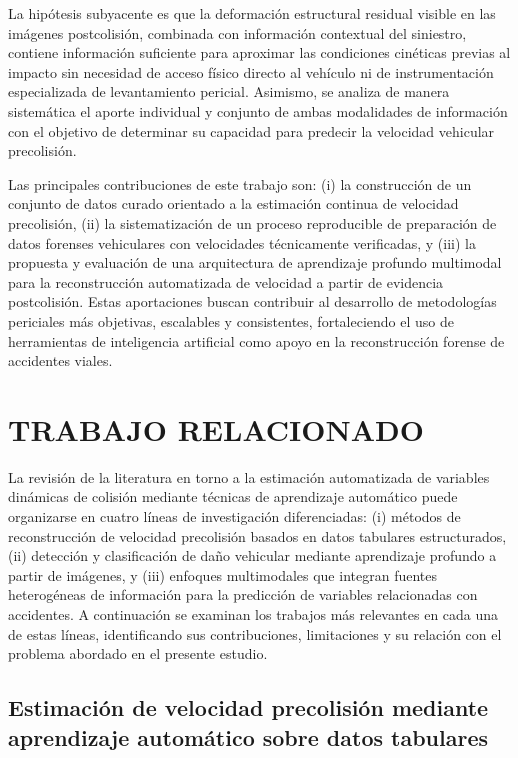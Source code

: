 \documentclass[esp]{SpeedEstimationAI_paper}
\begin{document}
La hipótesis subyacente es que la deformación estructural residual visible en las imágenes postcolisión, combinada con información contextual del siniestro, contiene información suficiente para aproximar las condiciones cinéticas previas al impacto sin necesidad de acceso físico directo al vehículo ni de instrumentación especializada de levantamiento pericial. Asimismo, se analiza de manera sistemática el aporte individual y conjunto de ambas modalidades de información con el objetivo de determinar su capacidad para predecir la velocidad vehicular precolisión.

Las principales contribuciones de este trabajo son: (i) la construcción de un conjunto de datos curado orientado a la estimación continua de velocidad precolisión, (ii) la sistematización de un proceso reproducible de preparación de datos forenses vehiculares con velocidades técnicamente verificadas, y (iii) la propuesta y evaluación de una arquitectura de aprendizaje profundo multimodal para la reconstrucción automatizada de velocidad a partir de evidencia postcolisión. Estas aportaciones buscan contribuir al desarrollo de metodologías periciales más objetivas, escalables y consistentes, fortaleciendo el uso de herramientas de inteligencia artificial como apoyo en la reconstrucción forense de accidentes viales.

\section{TRABAJO RELACIONADO}
La revisión de la literatura en torno a la estimación automatizada de variables dinámicas de colisión mediante técnicas de aprendizaje automático puede organizarse en cuatro líneas de investigación diferenciadas: (i) métodos de reconstrucción de velocidad precolisión basados en datos tabulares estructurados, (ii) detección y clasificación de daño vehicular mediante aprendizaje profundo a partir de imágenes, y (iii) enfoques multimodales que integran fuentes heterogéneas de información para la predicción de variables relacionadas con accidentes. A continuación se examinan los trabajos más relevantes en cada una de estas líneas, identificando sus contribuciones, limitaciones y su relación con el problema abordado en el presente estudio.

\subsection{Estimación de velocidad precolisión mediante aprendizaje automático sobre datos tabulares}
\end{document}
